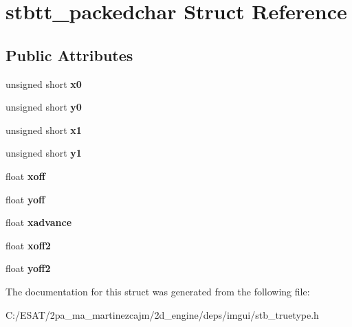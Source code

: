 \hypertarget{structstbtt__packedchar}{}\section{stbtt\+\_\+packedchar Struct Reference}
\label{structstbtt__packedchar}
\subsection*{Public Attributes}
\begin{DoxyCompactItemize}
\item 
\mbox{\label{structstbtt__packedchar_a02cb73a5af37ed60dafd5e4b731af09e}} 
unsigned short {\bfseries x0}
\item 
\mbox{\label{structstbtt__packedchar_a43429c9545ca8ccf14012cedcf83c1a7}} 
unsigned short {\bfseries y0}
\item 
\mbox{\label{structstbtt__packedchar_a99d371f0261cd13dfd1a179f143175d1}} 
unsigned short {\bfseries x1}
\item 
\mbox{\label{structstbtt__packedchar_a9569073ba79fad355210b6ffc35905a7}} 
unsigned short {\bfseries y1}
\item 
\mbox{\label{structstbtt__packedchar_adb30c50674c79d32116ae6f94bd5893f}} 
float {\bfseries xoff}
\item 
\mbox{\label{structstbtt__packedchar_a6f342ae10df5319f4999ffd256567142}} 
float {\bfseries yoff}
\item 
\mbox{\label{structstbtt__packedchar_a28707ae98d1fa946b3390840aeff76ab}} 
float {\bfseries xadvance}
\item 
\mbox{\label{structstbtt__packedchar_a3a33880f925ca826c908cbf9f0673c9f}} 
float {\bfseries xoff2}
\item 
\mbox{\label{structstbtt__packedchar_a2ec5bbd1010c9a9b7cbdeb7503dcaffa}} 
float {\bfseries yoff2}
\end{DoxyCompactItemize}


The documentation for this struct was generated from the following file\+:\begin{DoxyCompactItemize}
\item 
C\+:/\+E\+S\+A\+T/2pa\+\_\+ma\+\_\+martinezcajm/2d\+\_\+engine/deps/imgui/stb\+\_\+truetype.\+h\end{DoxyCompactItemize}
